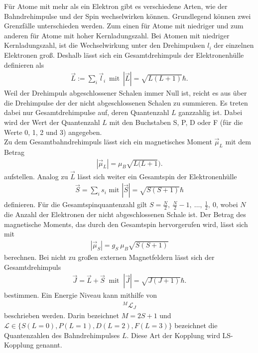 Für Atome mit mehr als ein Elektron gibt es verschiedene Arten,
wie der Bahndrehimpulse und der Spin wechselwirken können.
Grundlegend können zwei  Grenzfälle unterschieden werden.
Zum einen für Atome mit niedriger und zum anderen für Atome mit hoher Kernladungszahl.
Bei Atomen mit niedriger Kernladungszahl, ist die Wechselwirkung unter den Drehimpulsen $l_{i}$
der einzelnen Elektronen groß.
Deshalb lässt sich ein Gesamtdrehimpuls der Elektronenhülle definieren als
\begin{align}
	\vec{L}:=\sum_i \vec{l}_i\, \text{ mit }\, |\vec{L}|=\sqrt{L(L+1)}\hbar.
\end{align}
Weil der Drehimpuls abgeschlossener Schalen immer Null ist,
reicht es aus über die Drehimpulse der der nicht abgeschlossenen Schalen zu summieren.
Es treten dabei nur Gesamtdrehimpulse auf, deren Quantenzahl $L$ ganzzahlig ist.
Dabei wird der Wert der Quantenzahl $L$ mit den Buchstaben S, P, D oder F
(für die Werte 0, 1, 2 und 3) angegeben.\\
Zu dem Gesamtbahndrehimpuls lässt sich ein magnetisches Moment $\vec{\mu}_L$ mit dem Betrag
\begin{align}
	|\vec{\mu}_L|=\mu_B\sqrt{L(L+1}).
\end{align}
aufstellen.
Analog zu $\vec{L}$ lässt sich weiter ein Gesamtspin der Elektronenhülle
\begin{align}
	\vec{S}=\sum_is_i \text{ mit } |\vec{S}|=\sqrt{S(S+1)}\hbar
\end{align}
definieren.
Für die Gesamtspinquantenzahl gilt $S=\frac{N}{2},\ \frac{N}{2}-1 ,\ \dots,\ \frac{1}{2},\ 0$,
wobei $N$ die Anzahl der Elektronen der nicht abgeschlossenen Schale ist.
Der Betrag des magnetische Moments, das durch den Gesamtspin hervorgerufen wird, lässt sich mit
\begin{align}
	|\vec{\mu}_S|=g_S\ \mu_B\sqrt{S(S+1)}
\end{align}
berechnen.
Bei nicht zu großen externen Magnetfeldern lässt sich der Gesamtdrehimpuls
\begin{align}
	\vec{J}=\vec{L}+\vec{S} \ \text{ mit }\ |\vec{J}|=\sqrt{J(J+1)}\hbar.
\end{align}
bestimmen.
Ein Energie Niveau kann mithilfe von
\begin{align}
	{}^M\mathcal{L}_J
\end{align}
beschrieben werden.
Darin bezeichnet $M=2S+1$ und $\mathcal{L}\in\{S(L=0), P(L=1), D(L=2), F(L=3)\}$
bezeichnet die Quantenzahlen des Bahndrehimpulses $L$.
Diese Art der Kopplung wird LS-Kopplung genannt.\\

